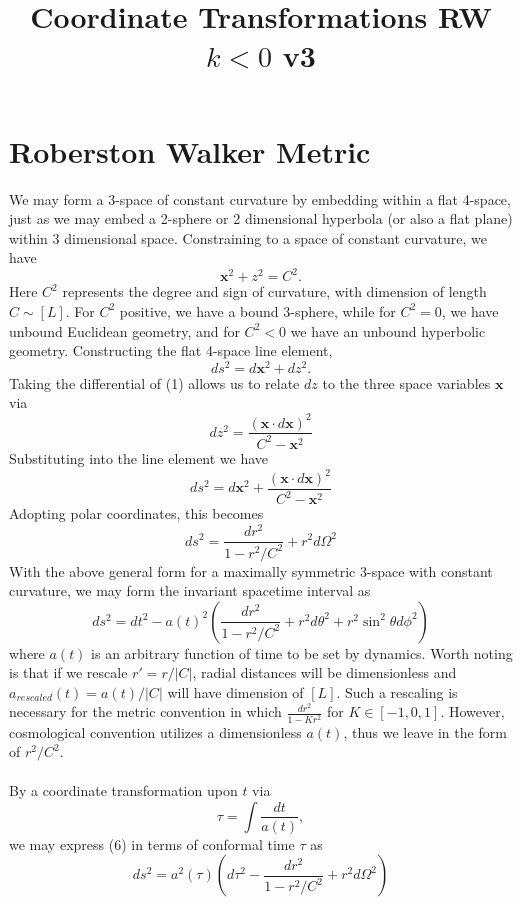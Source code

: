 \documentclass[10pt,letterpaper]{article}
\title{Coordinate Transformations RW $k<0$ v3 }
\date{}
\newcommand{\vect}[1]{\mathbf{#1}}
\begin{document}
\maketitle
\noindent 
\section*{Roberston Walker Metric}
We may form a 3-space of constant curvature by embedding within a flat 4-space, just as we may embed a 2-sphere or 2 dimensional hyperbola (or also a flat plane) within 3 dimensional space. Constraining to a space of constant curvature, we have
\begin{equation}
\vect x^2 +z^2 = C^2.
\end{equation}
Here $C^2$ represents the degree and sign of curvature, with dimension of length $C \sim [L]$. For $C^2$ positive, we have a bound 3-sphere, while for $C^2 =0$, we have unbound Euclidean geometry, and for $C^2 <0$ we have an unbound hyperbolic geometry. Constructing the flat 4-space line element,
\begin{equation}
ds^2 = d\vect x^2 + dz^2.
\end{equation}
Taking the differential of (1) allows us to relate $dz$ to the three space variables $\vect x$ via
\begin{equation}
dz^2 = \frac{ (\vect x\cdot d \vect x)^2}{C^2-\vect x^2}
\end{equation}
Substituting into the line element we have
\begin{equation}
	ds^2 = d\vect x^2 +   \frac{ (\vect x\cdot d \vect x)^2}{C^2-\vect x^2}
\end{equation}
Adopting polar coordinates, this becomes
\begin{equation}
 ds^2 = \frac{dr^2}{1-r^2/C^2} + r^2 d\Omega^2
\end{equation}
With the above general form for a maximally symmetric 3-space with constant curvature, we may form the invariant spacetime interval as 
\begin{equation}
ds^2 = dt^2 - a(t)^2 \left(  \frac{dr^2}{1-r^2/C^2} + r^2 d\theta^2 + r^2\sin^2\theta d\phi^2 \right)
\end{equation}
where $a(t)$ is an arbitrary function of time to be set by dynamics. Worth noting is that if we rescale $r' = r/|C|$, radial distances will be dimensionless and $a_{rescaled}(t) = a(t)/|C|$ will have dimension of $[L]$. Such a rescaling is necessary for the metric convention in which $\frac{dr^2}{1-Kr^2}$ for $K \in [-1,0,1]$. However, cosmological convention utilizes a dimensionless $a(t)$, thus we leave in the form of $r^2/C^2$. 
\\ \\
By a coordinate transformation upon $t$ via
\begin{equation}
\tau = \int \frac{dt}{a(t)},
\end{equation}
we may express (6) in terms of conformal time $\tau$ as 
\begin{equation}
ds^2 = a^2(\tau) \left ( d\tau^2 - \frac{dr^2}{1-r^2/C^2} + r^2 d\Omega^2 \right)
\end{equation}
\end{document}
